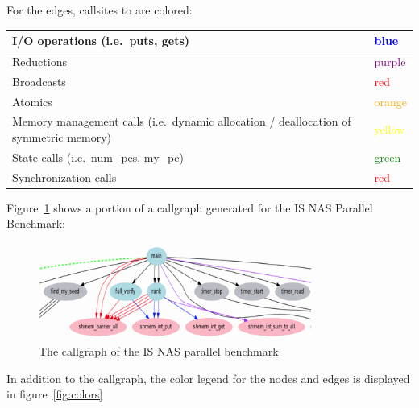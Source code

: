\vspace{0.1in}

For the edges, callsites to \openshmem are colored:

\vspace{0.1in}

\begin{center}
  \begin{tabular}{| p{10cm} | l |}
    \hline
    I/O operations (i.e.\ puts, gets) & \textcolor{Blue}{blue} \\
    \hline
    Reductions & \textcolor{Purple}{purple} \\
    \hline
    Broadcasts & \textcolor{Red}{red} \\
    \hline
    Atomics & \textcolor{Orange}{orange} \\
    \hline
    Memory management calls (i.e.\ dynamic allocation / deallocation of symmetric memory) & \textcolor{Yellow}{yellow} \\
    \hline
    State calls (i.e.\ num\_pes, my\_pe) & \textcolor{Green}{green} \\
    \hline
    Synchronization calls & \textcolor{Red}{red} \\
    \hline
  \end{tabular}
\end{center}

\vspace{0.1in}

Figure~\ref{fig:is-callgraph} shows a portion of a callgraph generated
for the IS NAS Parallel Benchmark:

\begin{figure}[!ht]
  \begin{center}
    \includegraphics[width=0.8\textwidth]{./image004}
    \caption{The \openshmem callgraph of the IS NAS parallel benchmark}
    \label{fig:is-callgraph}
  \end{center}
\end{figure}

In addition to the callgraph, the color legend for the nodes and edges
is displayed in figure~\ref{fig:colors}

\vspace{0.1in}


